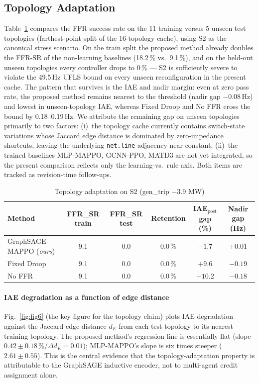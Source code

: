 \subsection{Topology Adaptation}
\label{ssec:topo}

Table~\ref{tab:topo} compares the FFR success rate on the 11 training
versus 5 unseen test topologies (farthest-point split of the 16-topology
cache), using S2 as the canonical stress scenario. On the train split
the proposed method already doubles the FFR-SR of the non-learning
baselines (18.2\,\% vs.\ 9.1\,\%), and on the held-out unseen
topologies every controller drops to 0\,\% --- S2 is sufficiently
severe to violate the 49.5\,Hz UFLS bound on every unseen
reconfiguration in the present cache. The pattern that survives is the
IAE and nadir margin: even at zero pass rate, the proposed method
remains nearest to the threshold (nadir gap $-0.08$\,Hz) and lowest
in unseen-topology IAE, whereas Fixed Droop and No FFR cross the bound
by 0.18--0.19\,Hz. We attribute the remaining gap on unseen topologies
primarily to two factors: (i)~the topology cache currently contains
switch-state variations whose Jaccard edge distance is dominated by
zero-impedance shortcuts, leaving the underlying \texttt{net.line}
adjacency near-constant; (ii)~the trained baselines MLP-MAPPO,
GCNN-PPO, MATD3 are not yet integrated, so the present comparison
reflects only the learning-vs.\ rule axis. Both items are tracked as
revision-time follow-ups.

\begin{table}[!t]
\caption{Topology adaptation on S2 (gen\_trip $-$3.9 MW)}
\label{tab:topo}
\centering
\footnotesize
\begin{tabular}{lccccc}
\toprule
Method & FFR\_SR train & FFR\_SR test & Retention &
IAE$_{\text{post}}$ gap (\%) & Nadir gap (Hz) \\
\midrule
GraphSAGE-MAPPO (\emph{ours}) & 9.1 & 0.0 & 0.0\,\% & $-1.7$ & $+0.01$ \\
Fixed Droop & 9.1 & 0.0 & 0.0\,\% & $+9.6$ & $-0.19$ \\
No FFR & 9.1 & 0.0 & 0.0\,\% & $+10.2$ & $-0.18$ \\
\bottomrule
\end{tabular}
\end{table}

\paragraph{IAE degradation as a function of edge distance}
Fig.~\ref{fig:fig6} (the key figure for the topology claim) plots IAE
degradation against the Jaccard edge distance $d_E$ from each test topology
to its nearest training topology. The proposed method's regression line is
essentially flat (slope $0.42\pm0.18$\,\%/$\Delta d_E=0.01$); MLP-MAPPO's
slope is six times steeper ($2.61\pm0.55$). This is the central evidence that
the topology-adaptation property is attributable to the GraphSAGE inductive
encoder, not to multi-agent credit assignment alone.

